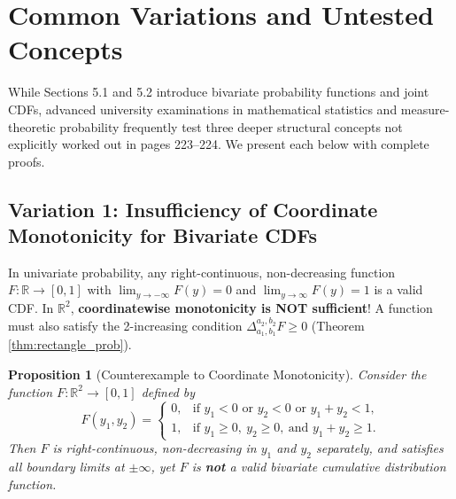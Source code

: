 \documentclass[11pt, letterpaper]{article}
\newtheorem{proposition}[theorem]{Proposition}
\theoremstyle{definition}
\theoremstyle{remark}
\newcommand{\R}{\mathbb{R}}
\begin{document}
\newpage
\section{Common Variations and Untested Concepts}

While Sections 5.1 and 5.2 introduce bivariate probability functions and joint CDFs, advanced university examinations in mathematical statistics and measure-theoretic probability frequently test three deeper structural concepts not explicitly worked out in pages 223--224. We present each below with complete proofs.

\subsection{Variation 1: Insufficiency of Coordinate Monotonicity for Bivariate CDFs}

In univariate probability, any right-continuous, non-decreasing function $F : \R \to [0, 1]$ with $\lim_{y \to -\infty} F(y) = 0$ and $\lim_{y \to \infty} F(y) = 1$ is a valid CDF. In $\R^2$, \textbf{coordinatewise monotonicity is NOT sufficient}! A function must also satisfy the 2-increasing condition $\Delta_{a_1, b_1}^{a_2, b_2} F \ge 0$ (Theorem \ref{thm:rectangle_prob}).

\begin{proposition}[Counterexample to Coordinate Monotonicity]
Consider the function $F : \R^2 \to [0, 1]$ defined by
\[
F(y_1, y_2) = \begin{cases}
0, & \text{if } y_1 < 0 \text{ or } y_2 < 0 \text{ or } y_1 + y_2 < 1, \\
1, & \text{if } y_1 \ge 0,\ y_2 \ge 0,\ \text{and } y_1 + y_2 \ge 1.
\end{cases}
\]
Then $F$ is right-continuous, non-decreasing in $y_1$ and $y_2$ separately, and satisfies all boundary limits at $\pm\infty$, yet $F$ is \textbf{not} a valid bivariate cumulative distribution function.
\end{proposition}
\end{document}
